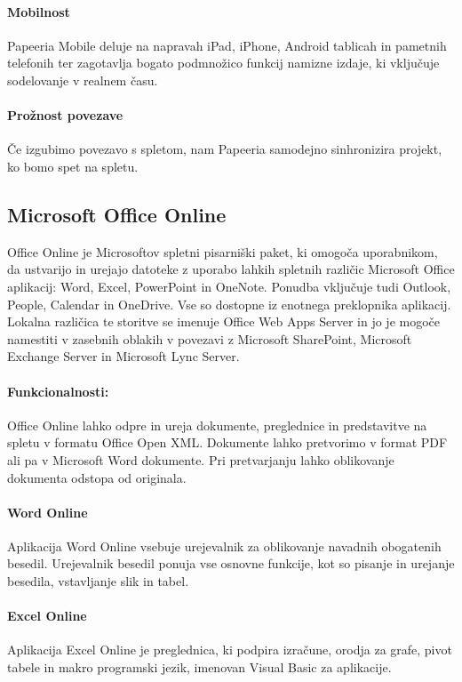 \documentclass[a4paper, 12pt]{book}
\begin{document}
\paragraph{Mobilnost}
Papeeria Mobile deluje na napravah iPad, iPhone, Android tablicah in pametnih telefonih ter zagotavlja bogato podmnožico funkcij namizne izdaje, ki vključuje sodelovanje v realnem času. 

\paragraph{Prožnost povezave}
Če izgubimo povezavo s spletom, nam Papeeria samodejno sinhronizira projekt, ko bomo spet na spletu. 

\subsection{Microsoft Office Online}
Office Online je Microsoftov spletni pisarniški paket, ki omogoča uporabnikom, da ustvarijo in urejajo datoteke z uporabo lahkih spletnih različic Microsoft Office aplikacij: Word, Excel, PowerPoint in OneNote. Ponudba vključuje tudi Outlook, People, Calendar in OneDrive. Vse so dostopne iz enotnega preklopnika aplikacij. Lokalna različica te storitve se imenuje Office Web Apps Server in jo je mogoče namestiti v zasebnih oblakih v povezavi z Microsoft SharePoint, Microsoft Exchange Server in Microsoft Lync Server. \cite{105}

\paragraph{Funkcionalnosti:\\}
Office Online lahko odpre in ureja dokumente, preglednice in predstavitve na spletu v formatu Office Open XML. Dokumente lahko pretvorimo v format PDF ali pa v Microsoft Word dokumente. Pri pretvarjanju lahko oblikovanje dokumenta odstopa od originala. \cite{106} 

\paragraph{Word Online}
Aplikacija Word Online vsebuje urejevalnik za oblikovanje navadnih obogatenih besedil. Urejevalnik besedil ponuja vse osnovne funkcije, kot so pisanje in urejanje besedila, vstavljanje slik in tabel.

\paragraph{Excel Online}
Aplikacija Excel Online je preglednica, ki podpira  izračune, orodja za grafe, pivot tabele in makro programski jezik, imenovan Visual Basic za aplikacije. 
\end{document}
